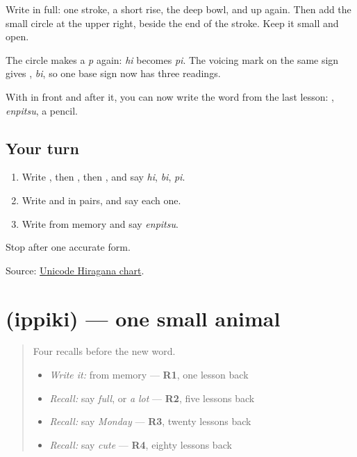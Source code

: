 Write \textbf{} in full: one stroke, a short rise, the deep bowl, and up again. Then add the small circle at the upper right, beside the end of the stroke. Keep it small and open.

The circle makes a \emph{p} again: \emph{hi} becomes \emph{pi}. The voicing mark on the same sign gives \textbf{}, \emph{bi}, so one base sign now has three readings.

With \textbf{} in front and \textbf{} after it, you can now write the word from the last lesson: \textbf{}, \emph{enpitsu}, a pencil.

\subsection*{Your turn}
\begin{enumerate}
\raggedright
  \item Write \textbf{}, then \textbf{}, then \textbf{}, and say \emph{hi}, \emph{bi}, \emph{pi}.
  \item Write \textbf{ } and \textbf{ } in pairs, and say each one.
  \item Write \textbf{} from memory and say \emph{enpitsu}.
\end{enumerate}

\begin{tcolorbox}[breakable,colback=teal!4,colframe=teal!35!black,title={Before you move on}]
Stop after one accurate form.

Source: \href{https://www.unicode.org/charts/PDF/U3040.pdf}{Unicode Hiragana chart}.
\end{tcolorbox}
\section[\texorpdfstring{\ja{いっぴき} (ippiki)}{いっぴき (ippiki)}]{ (ippiki) — one small animal}

\label{lesson:JA-C137-ippiki}



\begin{quote}
Four recalls before the new word.

\begin{itemize}
\raggedright
  \item \emph{Write it:} \textbf{} from memory — \textbf{R1}, one lesson back
  \item \emph{Recall:} say \emph{full}, or \emph{a lot} — \textbf{R2}, five lessons back
  \item \emph{Recall:} say \emph{Monday} — \textbf{R3}, twenty lessons back
  \item \emph{Recall:} say \emph{cute} — \textbf{R4}, eighty lessons back
\end{itemize}
\end{quote}

